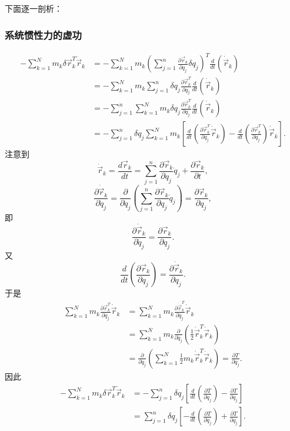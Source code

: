 下面逐一剖析：

\subsubsection{系统惯性力的虚功}
\[
\begin{aligned}
-\sum_{k=1}^N m_k \delta \vec{r}_k^T \ddot{\vec{r}}_k &= -\sum_{k=1}^N m_k \left( \sum_{j=1}^n \frac{\partial \vec{r}_k}{\partial q_j} \delta q_j \right)^T \frac{d}{dt}\left( \dot{\vec{r}}_k \right) \\
&= -\sum_{k=1}^N m_k \sum_{j=1}^n \delta q_j \frac{\partial \vec{r}_k^T}{\partial q_j} \frac{d}{dt}\left( \dot{\vec{r}}_k \right) \\
&= -\sum_{j=1}^n \sum_{k=1}^N m_k \delta q_j \frac{\partial \vec{r}_k^T}{\partial q_j} \frac{d}{dt}\left( \dot{\vec{r}}_k \right) \\
&= -\sum_{j=1}^n \delta q_j \sum_{k=1}^N m_k \left[ \frac{d}{dt}\left( \frac{\partial \vec{r}_k^T}{\partial q_j} \dot{\vec{r}}_k \right) - \frac{d}{dt}\left( \frac{\partial \vec{r}_k^T}{\partial q_j} \right) \dot{\vec{r}}_k \right].
\end{aligned}
\]
注意到
\[
\dot{\vec{r}}_k = \frac{d \vec{r}_k}{dt} = \sum_{j=1}^n \frac{\partial \vec{r}_k}{\partial q_j} \dot{q}_j + \frac{\partial \vec{r}_k}{\partial t},
\]
\[
\frac{\partial \dot{\vec{r}}_k}{\partial \dot{q}_j} = \frac{\partial}{\partial \dot{q}_j}\left( \sum_{j=1}^n \frac{\partial \vec{r}_k}{\partial q_j} \dot{q}_j \right) = \frac{\partial \vec{r}_k}{\partial q_j},
\]
即
\[
\frac{\partial \dot{\vec{r}}_k}{\partial \dot{q}_j} = \frac{\partial \vec{r}_k}{\partial q_j}.
\]
又
\[
\frac{d}{dt}\left( \frac{\partial \vec{r}_k}{\partial q_j} \right) = \frac{\partial \dot{\vec{r}}_k}{\partial q_j}.
\]
于是
\[
\begin{aligned}
\sum_{k=1}^N m_k \frac{\partial \vec{r}_k^T}{\partial q_j} \dot{\vec{r}}_k &= \sum_{k=1}^N m_k \frac{\partial \dot{\vec{r}}_k^T}{\partial \dot{q}_j} \dot{\vec{r}}_k \\
&= \sum_{k=1}^N m_k \frac{\partial}{\partial \dot{q}_j} \left( \frac{1}{2} \dot{\vec{r}}_k^T \dot{\vec{r}}_k \right) \\
&= \frac{\partial}{\partial \dot{q}_j} \left( \sum_{k=1}^N \frac{1}{2} m_k \dot{\vec{r}}_k^T \dot{\vec{r}}_k \right) = \frac{\partial T}{\partial \dot{q}_j}.
\end{aligned}
\]
因此
\[
\begin{aligned}
-\sum_{k=1}^N m_k \delta \vec{r}_k^T \ddot{\vec{r}}_k &= -\sum_{j=1}^n \delta q_j \left[ \frac{d}{dt}\left( \frac{\partial T}{\partial \dot{q}_j} \right) - \frac{\partial T}{\partial q_j} \right] \\
&= \sum_{j=1}^n \delta q_j \left[ -\frac{d}{dt}\left( \frac{\partial T}{\partial \dot{q}_j} \right) + \frac{\partial T}{\partial q_j} \right].
\end{aligned}
\]

